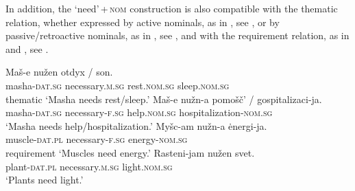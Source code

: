 \documentclass[output=paper]{langscibook}
\begin{document}
\ea \label{nuzhen-R}
\z\z

\noindent In addition, the `need'\,+\,\textsc{nom} construction is also compatible with the thematic relation, whether expressed by active nominals, as in , see , or by passive/retroactive nominals, as in , see , and with the requirement relation, as in  and , see .

\ea
\ea \label{nuzhen-active}\gll Maš-e nužen otdyx / son.\\
masha-\textsc{dat.sg} necessary.\textsc{m.sg} rest.\textsc{nom.sg} {} sleep.\textsc{nom.sg}\\ \hfill thematic
\glt `Masha needs rest/sleep.'
\ex \label{nuzhen-passive}\gll Maš-e nužn-a pomošč' / gospitalizaci-ja.\\
masha-\textsc{dat.sg} necessary-\textsc{f.sg} help.\textsc{nom.sg} {}  hospitalization-\textsc{nom.sg}\\
\glt `Masha needs help/hospitalization.'
\z\ex \ea \label{nuzhen-muscles}\gll Myšc-am nužn-a ėnergi-ja. \\
muscle-\textsc{dat.pl} necessary-\textsc{f.sg} energy-\textsc{nom.sg}\\ \hfill requirement
\glt `Muscles need energy.'
\ex \label{nuzhen-plants}\gll Rasteni-jam nužen svet.\\
plant-\textsc{dat.pl} necessary.\textsc{m.sg} light.\textsc{nom.sg}\\
\glt `Plants need light.'
\z\z
\end{document}

